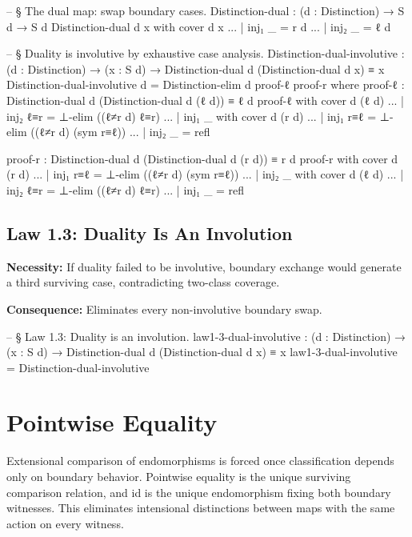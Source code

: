 \documentclass[11pt,a4paper]{book}
\def\texttt#1{#1}%
\begin{document}
\begin{code}
-- § The dual map: swap boundary cases.
Distinction-dual : (d : Distinction) → S d → S d
Distinction-dual d x with cover d x
... | inj₁ _ = r d
... | inj₂ _ = ℓ d

-- § Duality is involutive by exhaustive case analysis.
Distinction-dual-involutive :
  (d : Distinction) →
  (x : S d) →
  Distinction-dual d (Distinction-dual d x) ≡ x
Distinction-dual-involutive d =
  Distinction-elim d proof-ℓ proof-r
  where
    proof-ℓ : Distinction-dual d (Distinction-dual d (ℓ d)) ≡ ℓ d
    proof-ℓ with cover d (ℓ d)
    ... | inj₂ ℓ≡r = ⊥-elim ((ℓ≠r d) ℓ≡r)
    ... | inj₁ _ with cover d (r d)
    ... | inj₁ r≡ℓ = ⊥-elim ((ℓ≠r d) (sym r≡ℓ))
    ... | inj₂ _   = refl

    proof-r : Distinction-dual d (Distinction-dual d (r d)) ≡ r d
    proof-r with cover d (r d)
    ... | inj₁ r≡ℓ = ⊥-elim ((ℓ≠r d) (sym r≡ℓ))
    ... | inj₂ _ with cover d (ℓ d)
    ... | inj₂ ℓ≡r = ⊥-elim ((ℓ≠r d) ℓ≡r)
    ... | inj₁ _   = refl
\end{code}

\subsection{Law 1.3: Duality Is An Involution}

\textbf{Necessity:} If duality failed to be involutive, boundary exchange would generate a third surviving case, contradicting two-class coverage.

\textbf{Consequence:} Eliminates every non-involutive boundary swap.

\begin{code}
-- § Law 1.3: Duality is an involution.
law1-3-dual-involutive :
  (d : Distinction) →
  (x : S d) →
  Distinction-dual d (Distinction-dual d x) ≡ x
law1-3-dual-involutive = Distinction-dual-involutive
\end{code}

\section{Pointwise Equality}

Extensional comparison of endomorphisms is forced once classification depends only on boundary behavior.
Pointwise equality is the unique surviving comparison relation, and \texttt{id} is the unique endomorphism fixing both boundary witnesses.
This eliminates intensional distinctions between maps with the same action on every witness.
\end{document}
